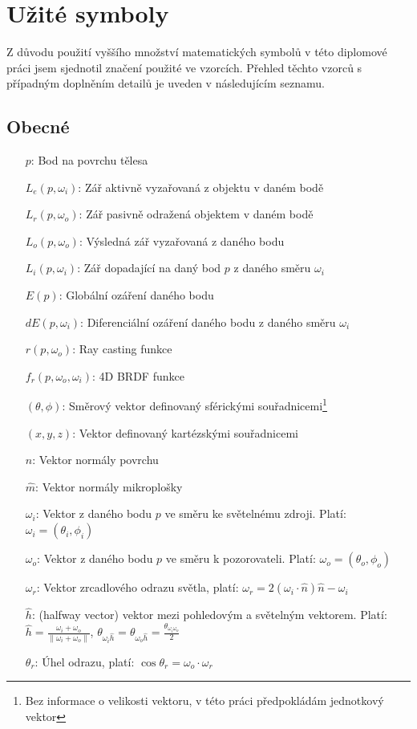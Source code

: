 \documentclass[czech,master]{diploma}
\newcommand{\uvec}[1]{\hat{#1}}
\newcommand{\point}{p}
\newcommand{\brdf}{f_r\left(\point,\omega_{o},\omega_{i}\right)}
\newcommand{\normVec}{\uvec{n}}
\newcommand{\normMicroVec}{\uvec{m}}
\newcommand{\inVec}{\omega_{i}}
\newcommand{\outVec}{\omega_{o}}
\newcommand{\refl}{\omega_{r}}
\newcommand{\halfVec}{\uvec{h}}
\newcommand{\reflRadiance}{L_r\left(\point,\outVec\right)}
\newcommand{\outRadiance}{L_o\left(\point,\outVec\right)}
\newcommand{\inRadiance}{L_i\left(\point,\inVec\right)}
\newcommand{\emitRadiance}{L_e\left(\point,\inVec\right)}
\newcommand{\rt}{r\left(\point,\outVec\right)}
\newcommand{\irradiance}{E\left(\point\right)}
\newcommand{\difirradiance}{dE\left(\point,\inVec\right)}
\begin{document}
\clearpage
\section{Užité symboly}
Z důvodu použití vyššího množství matematických symbolů v této diplomové práci jsem sjednotil značení použité ve vzorcích. Přehled těchto vzorců s případným doplněním detailů je uveden v následujícím seznamu.
\subsection{Obecné}
\begin{itemize}
  \item[\(p\):] Bod na povrchu tělesa
  \item[\(\emitRadiance\):] Zář aktivně vyzařovaná z objektu v daném bodě
  \item[\(\reflRadiance\):] Zář pasivně odražená objektem v daném bodě
  \item[\(\outRadiance\):] Výsledná zář vyzařovaná z daného bodu
  \item[\(\inRadiance\):] Zář dopadající na daný bod \(p\) z daného směru \(\inVec\)
  \item[\(\irradiance\):] Globální ozáření daného bodu
  \item[\(\difirradiance\):] Diferenciální ozáření daného bodu z daného směru \(\inVec\)
  \item[\(\rt\):] Ray casting funkce
  \item[\(\brdf\):] 4D BRDF funkce
  \item[\(\left(\theta,\phi\right)\):] Směrový vektor definovaný sférickými souřadnicemi\footnote{Bez informace o velikosti vektoru, v této práci předpokládám jednotkový vektor}
  \item[\(\left(x,y,z\right)\):] Vektor definovaný kartézskými souřadnicemi
  \item[\(\normVec\):] Vektor normály povrchu
  \item[\(\normMicroVec\):] Vektor normály mikroplošky
  \item[\(\inVec\):] Vektor z daného bodu \(p\) ve směru ke světelnému zdroji. Platí: \(\inVec = \left(\theta_i,\phi_i\right)\)
  \item[\(\outVec\):] Vektor z daného bodu \(p\) ve směru k pozorovateli. Platí: \(\outVec = \left(\theta_o,\phi_o\right)\)
  \item[\(\refl\):] Vektor zrcadlového odrazu světla, platí: \(\refl = 2\left(\inVec\cdot\normVec\right)\normVec-\inVec\)
  \item[\(\halfVec\):]  (halfway vector) vektor mezi pohledovým a světelným vektorem. Platí: \(\halfVec = \frac{\inVec + \outVec}{\| \inVec + \outVec\|}\), \(\theta_{\inVec\halfVec} = \theta_{\outVec\halfVec} = \frac{\theta_{\inVec\outVec}}{2} \)
  \item[\(\theta_r\):] Úhel odrazu, platí: \(\cos\theta_r = \outVec\cdot\refl\)
\end{itemize}
\end{document}
